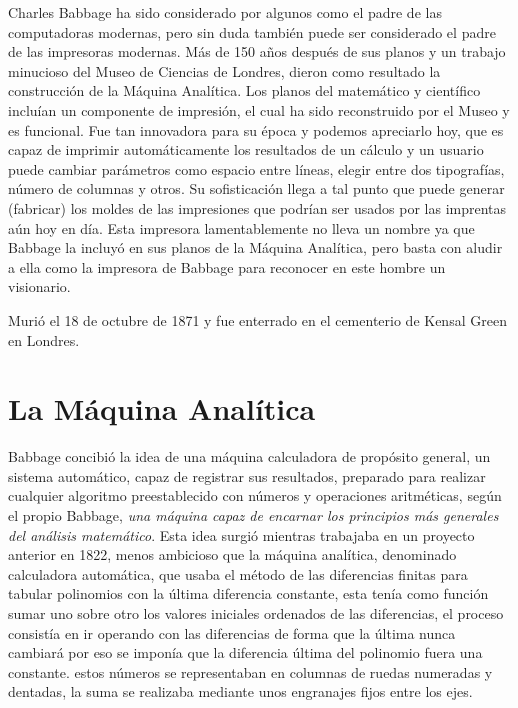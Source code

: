 \documentclass[runningheads,a4paper]{llncs}
\begin{document}
Charles Babbage ha sido considerado por algunos como el padre de las computadoras modernas, pero sin duda también puede ser considerado el padre de las impresoras modernas. Más de 150 años después de sus planos y un trabajo minucioso del Museo de Ciencias de Londres, dieron como resultado la construcción de la Máquina Analítica. Los planos del matemático y científico incluían un componente de impresión, el cual ha sido reconstruido por el Museo y es funcional. Fue tan innovadora para su época y podemos apreciarlo hoy, que es capaz de imprimir automáticamente los resultados de un cálculo y un usuario puede cambiar parámetros como espacio entre líneas, elegir entre dos tipografías, número de columnas y otros. Su sofisticación llega a tal punto que puede generar (fabricar) los moldes de las impresiones que podrían ser usados por las imprentas aún hoy en día. Esta impresora lamentablemente no lleva un nombre ya que Babbage la incluyó en sus planos de la Máquina Analítica, pero basta con aludir a ella como la impresora de Babbage para reconocer en este hombre un visionario.

Murió el 18 de octubre de 1871 y fue enterrado en el cementerio de Kensal Green en Londres.

\section{La Máquina Analítica}

Babbage concibió la idea de una máquina calculadora de propósito general, un sistema automático, capaz de 
registrar sus resultados, preparado para realizar cualquier algoritmo preestablecido con números y 
operaciones aritméticas, según el propio Babbage, \emph{una máquina capaz de encarnar los principios más 
generales del análisis matemático}. Esta idea surgió mientras trabajaba en un proyecto anterior en 1822, 
menos ambicioso que la máquina analítica, denominado calculadora automática, que usaba el método de las 
diferencias finitas para tabular polinomios con la última diferencia constante, esta tenía como función 
sumar uno sobre otro los valores iniciales ordenados de las diferencias, el proceso consistía en ir operando 
con las diferencias de forma que la última nunca cambiará por eso se imponía que la diferencia última del 
polinomio fuera una constante. estos números se representaban en columnas de ruedas numeradas y dentadas, 
la suma se realizaba mediante unos engranajes fijos entre los ejes.
\end{document}

